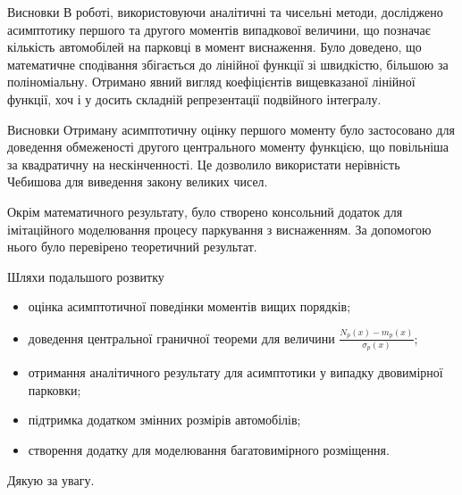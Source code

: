 \begin{frame}{Висновки}
	В роботі, використовуючи аналітичні та чисельні методи, досліджено асимптотику першого та другого моментів випадкової величини, що позначає кількість автомобілей на парковці в момент виснаження. Було доведено, що математичне сподівання збігається до лінійної функції зі швидкістю, більшою за поліноміальну. Отримано явний вигляд коефіцієнтів вищевказаної лінійної функції, хоч і у досить складній репрезентації подвійного інтегралу.
\end{frame}

\begin{frame}{Висновки}
	Отриману асимптотичну оцінку першого моменту було застосовано для доведення обмеженості другого центрального моменту функцією, що повільніша за квадратичну на нескінченності. Це дозволило використати нерівність Чебишова для виведення закону великих чисел.
	
	Окрім математичного результату, було створено консольний додаток для імітаційного моделювання процесу паркування з виснаженням. За допомогою нього було перевірено теоретичний результат.
\end{frame}

\begin{frame}{Шляхи подальшого розвитку}
	\begin{itemize}
		\item оцінка асимптотичної поведінки моментів вищих порядків;
		\item доведення центральної граничної теореми для величини $\frac{N_{p}(x) - m_{p}(x)}{\sigma_{p}(x)}$;
		\item отримання аналітичного результату для асимптотики у випадку двовимірної парковки;
		\item підтримка додатком змінних розмірів автомобілів;
		\item створення додатку для моделювання багатовимірного розміщення.
	\end{itemize}
\end{frame}

\begin{frame}
	\centering
	\Large Дякую за увагу.

\end{frame}